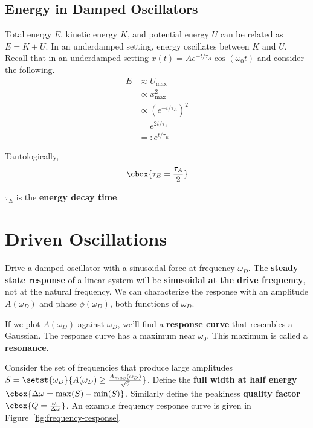 \documentclass{hw}
\renewcommand\emph[1]{{\bf\color{BlueViolet}#1}}
\begin{document}
\subsection{Energy in Damped Oscillators}
Total energy $E$, kinetic energy $K$, and potential energy $U$ can be related
as $E = K + U$. In an underdamped setting, energy oscillates between $K$ and
$U$. Recall that in an underdamped setting $x(t) = Ae^{-t/\tau_A} \cos(\omega_0
t)$ and consider the following.
\begin{align*}
  E &\approx U_{\text{max}} \\
    &\propto x_{\text{max}}^2 \\
    &\propto (e^{-t/\tau_A})^2 \\
    &= e^{2t/\tau_A} \\
    &=: e^{t/\tau_E}
\end{align*}

Tautologically,
\[\cbox{
  \tau_E = \frac{\tau_A}{2}
}\]

$\tau_E$ is the \emph{energy decay time}. 

\section{Driven Oscillations}
Drive a damped oscillator with a sinusoidal force at frequency $\omega_D$. The
\emph{steady state response} of a linear system will be \emph{sinusoidal at the
drive frequency}, not at the natural frequency. We can characterize the
response with an amplitude $A(\omega_D)$ and phase $\phi(\omega_D)$, both
functions of $\omega_D$.

If we plot $A(\omega_D)$ against $\omega_D$, we'll find a \emph{response curve}
that resembles a Gaussian. The response curve has a maximum near $\omega_0$.
This maximum is called a \emph{resonance}.

Consider the set of frequencies that produce large amplitudes $S =
\setst{\omega_D}{A(\omega_D) \geq \frac{A_{max}(\omega_D)}{\sqrt{2}}}$. Define
the \emph{full width at half energy} $\cbox{\Delta \omega = \max(S) -
\min(S)}$. Similarly define the peakiness \emph{quality factor} $\cbox{Q =
\frac{\omega_r}{\Delta \omega}}$. An example frequency response curve is given
in Figure~\ref{fig:frequency-response}.
\end{document}
